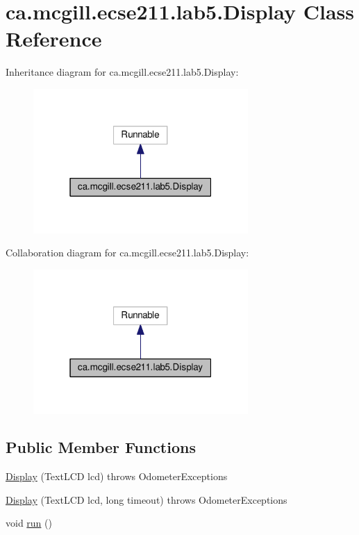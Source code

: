 \hypertarget{classca_1_1mcgill_1_1ecse211_1_1lab5_1_1_display}{}\section{ca.\+mcgill.\+ecse211.\+lab5.\+Display Class Reference}
\label{classca_1_1mcgill_1_1ecse211_1_1lab5_1_1_display}


Inheritance diagram for ca.\+mcgill.\+ecse211.\+lab5.\+Display\+:
\nopagebreak
\begin{figure}[H]
\begin{center}
\leavevmode
\includegraphics[width=232pt]{classca_1_1mcgill_1_1ecse211_1_1lab5_1_1_display__inherit__graph}
\end{center}
\end{figure}


Collaboration diagram for ca.\+mcgill.\+ecse211.\+lab5.\+Display\+:
\nopagebreak
\begin{figure}[H]
\begin{center}
\leavevmode
\includegraphics[width=232pt]{classca_1_1mcgill_1_1ecse211_1_1lab5_1_1_display__coll__graph}
\end{center}
\end{figure}
\subsection*{Public Member Functions}
\begin{DoxyCompactItemize}
\item 
\hyperlink{classca_1_1mcgill_1_1ecse211_1_1lab5_1_1_display_aeb15906f02c60c1ca449d4c37922739b}{Display} (Text\+L\+CD lcd)  throws Odometer\+Exceptions 
\item 
\hyperlink{classca_1_1mcgill_1_1ecse211_1_1lab5_1_1_display_abb1c01962b84cfad6ff897ce490b365a}{Display} (Text\+L\+CD lcd, long timeout)  throws Odometer\+Exceptions 
\item 
void \hyperlink{classca_1_1mcgill_1_1ecse211_1_1lab5_1_1_display_a047e885f7170ba80f60fd3b4b2bc79a9}{run} ()
\end{DoxyCompactItemize}


